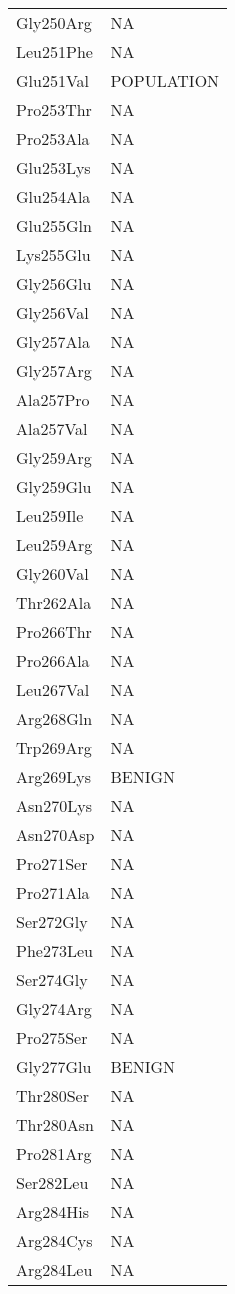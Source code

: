 \begin{tiny}
\begin{longtable}[l]{l|l}
	Gly250Arg & NA \\
	Leu251Phe & NA \\
	Glu251Val & POPULATION \\
	Pro253Thr & NA \\
	Pro253Ala & NA \\
	Glu253Lys & NA \\
	Glu254Ala & NA \\
	Glu255Gln & NA \\
	Lys255Glu & NA \\
	Gly256Glu & NA \\
	Gly256Val & NA \\
	Gly257Ala & NA \\
	Gly257Arg & NA \\
	Ala257Pro & NA \\
	Ala257Val & NA \\
	Gly259Arg & NA \\
	Gly259Glu & NA \\
	Leu259Ile & NA \\
	Leu259Arg & NA \\
	Gly260Val & NA \\
	Thr262Ala & NA \\
	Pro266Thr & NA \\
	Pro266Ala & NA \\
	Leu267Val & NA \\
	Arg268Gln & NA \\
	Trp269Arg & NA \\
	Arg269Lys & BENIGN \\
	Asn270Lys & NA \\
	Asn270Asp & NA \\
	Pro271Ser & NA \\
	Pro271Ala & NA \\
	Ser272Gly & NA \\
	Phe273Leu & NA \\
	Ser274Gly & NA \\
	Gly274Arg & NA \\
	Pro275Ser & NA \\
	Gly277Glu & BENIGN \\
	Thr280Ser & NA \\
	Thr280Asn & NA \\
	Pro281Arg & NA \\
	Ser282Leu & NA \\
	Arg284His & NA \\
	Arg284Cys & NA \\
	Arg284Leu & NA \\

\end{longtable}
\end{tiny}
